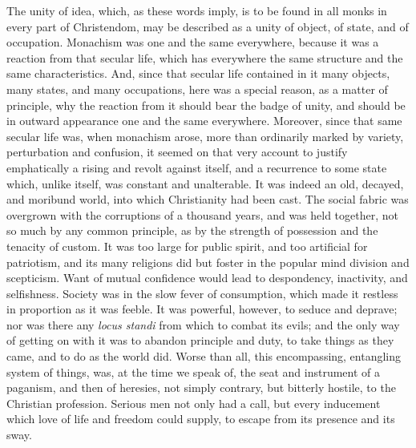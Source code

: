 The unity of idea, which, as these words imply, is to be found in
all monks in every part of Christendom, may be described as a unity of
object, of state, and of occupation. Monachism was one and the same
everywhere, because it was a reaction from that secular life, which
has everywhere the same structure and the same characteristics. And,
since that secular life contained in it many objects, many states, and
many occupations, here was a special reason, as a matter of principle,
why the reaction from it should bear the badge of unity, and should be in outward appearance one and the same everywhere. Moreover,
since that same secular life was, when monachism arose, more than
ordinarily marked by variety, perturbation and confusion, it seemed on
that very account to justify emphatically a rising and revolt against
itself, and a recurrence to some state which, unlike itself, was
constant and unalterable. It was indeed an old, decayed, and moribund
world, into which Christianity had been cast. The social fabric was
overgrown with the corruptions of a thousand years, and was held
together, not so much by any common principle, as by the strength of
possession and the tenacity of custom. It was too large for public
spirit, and too artificial for patriotism, and its many religions did
but foster in the popular mind division and scepticism. Want of mutual
confidence would lead to despondency, inactivity, and selfishness.
Society was in the slow fever of consumption, which made it restless
in proportion as it was feeble. It was powerful, however, to seduce
and deprave; nor was there any \emph{locus standi} from which to
combat its evils; and the only way of getting on with it was to
abandon principle and duty, to take things as they came, and to do as
the world did. Worse than all, this encompassing, entangling system of
things, was, at the time we speak of, the seat and instrument of a
paganism, and then of heresies, not simply contrary, but bitterly
hostile, to the Christian profession. Serious men not only had a call,
but every inducement which love of life and freedom could supply, to
escape from its presence and its sway.

